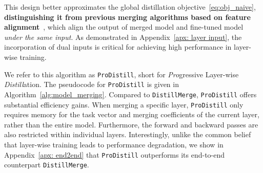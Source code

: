 This design better approximates the global distillation objective~\ref{eq:obj_naive}, \textbf{distinguishing it from previous merging algorithms based on feature alignment}~\citep{jin2022dataless, yang2024representation, anonymous2024leveraging}, which align the output of merged model and fine-tuned model \textit{under the same input}.
As demonstrated in Appendix~\ref{apx: layer input},  the incorporation of dual inputs is critical for achieving high performance in layer-wise training. 

We refer to this algorithm as \texttt{ProDistill}, short for \textit{Pro}gressive Layer-wise \textit{Distill}ation.
The pseudocode for \texttt{ProDistill} is given in Algorithm~\ref{alg:model_merging}.
Compared to \texttt{DistillMerge}, \texttt{ProDistill} offers substantial efficiency gains. When merging a specific layer, \texttt{ProDistill} only requires memory for the task vector and merging coefficients of the current layer, rather than the entire model. Furthermore, 
the forward and backward passes are also restricted within individual layers. Interestingly, unlike the common belief that layer-wise training leads to performance degradation, we show in Appendix~\ref{apx: end2end} that \texttt{ProDistill} outperforms its end-to-end counterpart \texttt{DistillMerge}.




